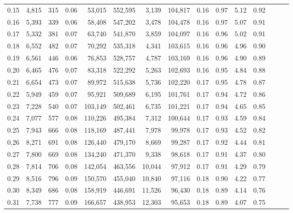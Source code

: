 \begin{tabular}{rrrrrrrrrrrrrrr}
0.15 &   4,815 &    315 &  0.06 &   53,015 &  552,595 &    3,139 &  104,817 &  0.16 &  0.97 &  5.12 &      0.92 \\
0.16 &   5,393 &    339 &  0.06 &   58,408 &  547,202 &    3,478 &  104,478 &  0.16 &  0.97 &  5.07 &      0.91 \\
0.17 &   5,332 &    381 &  0.07 &   63,740 &  541,870 &    3,859 &  104,097 &  0.16 &  0.96 &  5.02 &      0.91 \\
0.18 &   6,552 &    482 &  0.07 &   70,292 &  535,318 &    4,341 &  103,615 &  0.16 &  0.96 &  4.96 &      0.90 \\
0.19 &   6,561 &    446 &  0.06 &   76,853 &  528,757 &    4,787 &  103,169 &  0.16 &  0.96 &  4.90 &      0.89 \\
0.20 &   6,465 &    476 &  0.07 &   83,318 &  522,292 &    5,263 &  102,693 &  0.16 &  0.95 &  4.84 &      0.88 \\
0.21 &   6,654 &    473 &  0.07 &   89,972 &  515,638 &    5,736 &  102,220 &  0.17 &  0.95 &  4.78 &      0.87 \\
0.22 &   5,949 &    459 &  0.07 &   95,921 &  509,689 &    6,195 &  101,761 &  0.17 &  0.94 &  4.72 &      0.86 \\
0.23 &   7,228 &    540 &  0.07 &  103,149 &  502,461 &    6,735 &  101,221 &  0.17 &  0.94 &  4.65 &      0.85 \\
0.24 &   7,077 &    577 &  0.08 &  110,226 &  495,384 &    7,312 &  100,644 &  0.17 &  0.93 &  4.59 &      0.84 \\
0.25 &   7,943 &    666 &  0.08 &  118,169 &  487,441 &    7,978 &   99,978 &  0.17 &  0.93 &  4.52 &      0.82 \\
0.26 &   8,271 &    691 &  0.08 &  126,440 &  479,170 &    8,669 &   99,287 &  0.17 &  0.92 &  4.44 &      0.81 \\
0.27 &   7,800 &    669 &  0.08 &  134,240 &  471,370 &    9,338 &   98,618 &  0.17 &  0.91 &  4.37 &      0.80 \\
0.28 &   7,814 &    706 &  0.08 &  142,054 &  463,556 &   10,044 &   97,912 &  0.17 &  0.91 &  4.29 &      0.79 \\
0.29 &   8,516 &    796 &  0.09 &  150,570 &  455,040 &   10,840 &   97,116 &  0.18 &  0.90 &  4.22 &      0.77 \\
0.30 &   8,349 &    686 &  0.08 &  158,919 &  446,691 &   11,526 &   96,430 &  0.18 &  0.89 &  4.14 &      0.76 \\
0.31 &   7,738 &    777 &  0.09 &  166,657 &  438,953 &   12,303 &   95,653 &  0.18 &  0.89 &  4.07 &      0.75 \\

\end{tabular}
